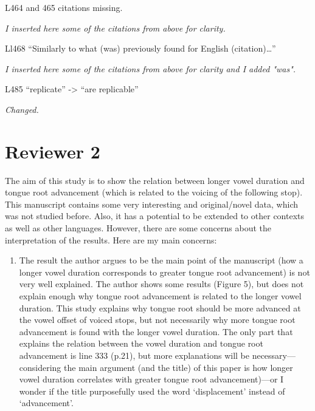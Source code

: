\documentclass[]{article}
\providecommand{\tightlist}{%
  \setlength{\itemsep}{0pt}\setlength{\parskip}{0pt}}
\begin{document}
L464 and 465 citations missing.

\begin{adjustwidth}{1cm}{} \textit{
I inserted here some of the citations from above for clarity.
} \end{adjustwidth}

Ll468 ``Similarly to what (was) previously found for English
(citation)\ldots{}''

\begin{adjustwidth}{1cm}{} \textit{
I inserted here some of the citations from above for clarity and I added "was".
} \end{adjustwidth}

L485 ``replicate'' -\textgreater{} ``are replicable''

\begin{adjustwidth}{1cm}{} \textit{
Changed.
} \end{adjustwidth}

\hypertarget{reviewer-2}{%
\section{Reviewer 2}\label{reviewer-2}}

The aim of this study is to show the relation between longer vowel
duration and tongue root advancement (which is related to the voicing of
the following stop). This manuscript contains some very interesting and
original/novel data, which was not studied before. Also, it has a
potential to be extended to other contexts as well as other languages.
However, there are some concerns about the interpretation of the
results. Here are my main concerns:

\begin{enumerate}
\def\labelenumi{\arabic{enumi}.}
\tightlist
\item
  The result the author argues to be the main point of the manuscript
  (how a longer vowel duration corresponds to greater tongue root
  advancement) is not very well explained. The author shows some results
  (Figure 5), but does not explain enough why tongue root advancement is
  related to the longer vowel duration. This study explains why tongue
  root should be more advanced at the vowel offset of voiced stops, but
  not necessarily why more tongue root advancement is found with the
  longer vowel duration. The only part that explains the relation
  between the vowel duration and tongue root advancement is line 333
  (p.21), but more explanations will be necessary---considering the main
  argument (and the title) of this paper is how longer vowel duration
  correlates with greater tongue root advancement)---or I wonder if the
  title purposefully used the word `displacement' instead of
  `advancement'.
\end{enumerate}
\end{document}
